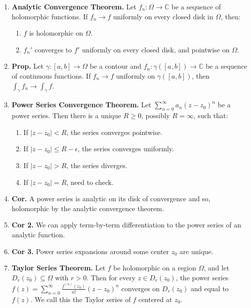 \documentclass[12pt]{article}
\theoremstyle{definition}
\theoremstyle{named}
\begin{document}
{\begin{multicols}{2}
\begin{spacing}{1.01}
\begin{enumerate}
    $$
    u(re^{i\phi}) = \frac{R^2 - r^2}{2\pi} \int_{0}^{2\pi} \frac{u(Re^{i\theta})}{R^2 - 2rR\cos(\theta - \phi) + r^2} d\theta. 
    $$
    \item \textbf{Analytic Convergence Theorem. } Let $f_n: \Omega \to \mathbb{C}$ be a sequence of holomorphic functions. If $f_n \to f$ uniformly on every closed disk in $\Omega$, then: 
    \begin{enumerate}
        \item $f$ is holomorphic on $\Omega$. 
        \item $f_n'$ converges to $f'$ uniformly on every closed disk, and pointwise on $\Omega$. 
    \end{enumerate} 
    \item \textbf{Prop. } Let $\gamma: [a,b] \to \Omega$ be a contour and $f_n: \gamma([a,b]) \to \mathbb{C}$ be a sequence of continuous functions. If $f_n \to f$ uniformly on $\gamma([a,b])$, then $\int_\gamma f_n \to \int_\gamma f$. 
    \item \textbf{Power Series Convergence Theorem. } Let $\sum_{n=0}^{\infty} a_n(z-z_0)^n$ be a power series. Then there is a unique $R \geq 0$, possibly $R = \infty$, such that: 
    \begin{enumerate}
        \item If $|z-z_0| < R$, the series converges pointwise. 
        \item If $|z-z_0| \leq R - \epsilon$, the series converges uniformly. 
        \item If $|z-z_0| > R$, the series diverges. 
        \item If $|z-z_0| = R$, need to check. 
    \end{enumerate}
    \item \textbf{Cor. } A power series is analytic on its disk of convergence and so, holomorphic by the analytic convergence theorem. 
    \item \textbf{Cor 2. } We can apply term-by-term differentiation to the power series of an analytic function. 
    \item \textbf{Cor 3. } Power series expansions around some center $z_0$ are unique. 
    \item \textbf{Taylor Series Theorem. } Let $f$ be holomorphic on a region $\Omega$, and let $D_r(z_0) \subseteq \Omega$ with $r > 0$. Then for every $z \in D_r(z_0)$, the power series $f(z) = \sum_{n=0}^{\infty} \frac{f^{(n)}(z_0)}{n!}(z-z_0)^n$ converges on $D_r(z_0)$ and equal to $f(z)$. We call this the Taylor series of $f$ centered at $z_0$. 

\end{enumerate}
\end{spacing}
\end{multicols}}
\end{document}

